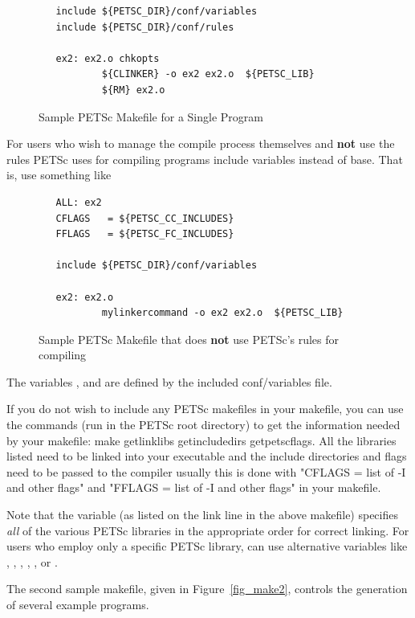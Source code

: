 {{{\begin{figure}[H]
{\begin{verbatim}
   include ${PETSC_DIR}/conf/variables
   include ${PETSC_DIR}/conf/rules

   ex2: ex2.o chkopts
           ${CLINKER} -o ex2 ex2.o  ${PETSC_LIB}
           ${RM} ex2.o
\end{verbatim}
}
\caption{Sample PETSc Makefile for a Single Program}
\label{fig_make1}
\end{figure}

For users who wish to manage the compile process themselves
and {\bf not} use the rules PETSc uses for compiling programs
include variables instead of base. That is, use something like

\begin{figure}[H]
{\small
\begin{verbatim}
   ALL: ex2
   CFLAGS   = ${PETSC_CC_INCLUDES}
   FFLAGS   = ${PETSC_FC_INCLUDES}

   include ${PETSC_DIR}/conf/variables

   ex2: ex2.o
           mylinkercommand -o ex2 ex2.o  ${PETSC_LIB}
\end{verbatim}
}
\caption{Sample PETSc Makefile that does {\bf not} use PETSc's rules for compiling}
\label{fig_make1var}
\end{figure}
The variables , 
and  are defined by the included conf/variables file.

If you do not wish to include any PETSc makefiles in your makefile,
you can use the commands (run in the PETSc root directory) to get the information
needed by your makefile: make getlinklibs getincludedirs getpetscflags.
All the libraries listed need to be linked into your executable and the
include directories and flags need to be passed to the compiler usually
this is done with "CFLAGS = list of -I and other flags" and
"FFLAGS = list of -I and other flags" in your makefile.



 
Note that the variable  (as listed on the link
line in the above makefile) specifies {\em all} of the various PETSc
libraries in the appropriate order for correct linking.  For users who
employ only a specific PETSc library, can use alternative variables
like  , ,
, ,
,  or
.

The second sample makefile, given in Figure~\ref{fig_make2},
controls the generation of several example programs.

}}}
